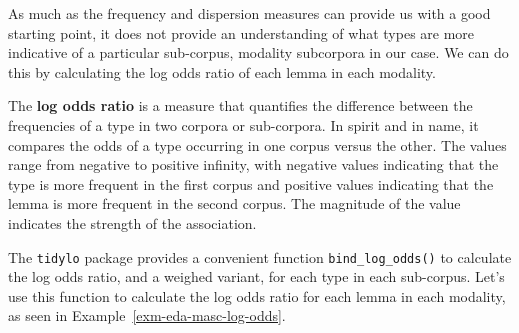 \documentclass[
  letterpaper,
  DIV=11,
  numbers=noendperiod]{scrreport}
\theoremstyle{definition}
\theoremstyle{remark}
\begin{document}
As much as the frequency and dispersion measures can provide us with a
good starting point, it does not provide an understanding of what types
are more indicative of a particular sub-corpus, modality subcorpora in
our case. We can do this by calculating the log odds ratio of each lemma
in each modality.

The \textbf{log odds ratio} is a measure that quantifies the difference
between the frequencies of a type in two corpora or sub-corpora. In
spirit and in name, it compares the odds of a type occurring in one
corpus versus the other. The values range from negative to positive
infinity, with negative values indicating that the type is more frequent
in the first corpus and positive values indicating that the lemma is
more frequent in the second corpus. The magnitude of the value indicates
the strength of the association.

The \texttt{tidylo} package provides a convenient function
\texttt{bind\_log\_odds()} to calculate the log odds ratio, and a
weighed variant, for each type in each sub-corpus. Let's use this
function to calculate the log odds ratio for each lemma in each
modality, as seen in Example~\ref{exm-eda-masc-log-odds}.
\end{document}
